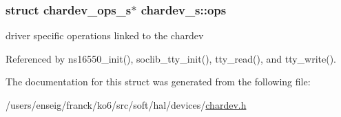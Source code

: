 \hypertarget{structchardev__s_a0b18bf4649bf11afe6ac3f50239144b8}{
\subsubsection[{ops}]{\setlength{\rightskip}{0pt plus 5cm}struct {\bf chardev\-\_\-ops\-\_\-s}$\ast$ chardev\-\_\-s\-::ops}}\label{structchardev__s_a0b18bf4649bf11afe6ac3f50239144b8}


driver specific operations linked to the chardev 



Referenced by ns16550\-\_\-init(), soclib\-\_\-tty\-\_\-init(), tty\-\_\-read(), and tty\-\_\-write().



The documentation for this struct was generated from the following file\-:\begin{DoxyCompactItemize}
\item 
/users/enseig/franck/ko6/src/soft/hal/devices/\hyperlink{chardev_8h}{chardev.\-h}\end{DoxyCompactItemize}
